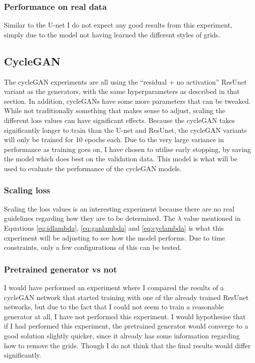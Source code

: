 \subsubsection{Performance on real data}
Similar to the U-net I do not expect any good results from this experiment, simply due to the model not having learned the different styles of grids.

\subsection{CycleGAN}
The cycleGAN experiments are all using the ``residual + no activation'' ResUnet variant as the generators, with the same hyperparameters as described in that section. In addition, cycleGANs have some more parameters that can be tweaked. While not traditionally something that makes sense to adjust, scaling the different loss values can have significant effects. Because the cycleGAN takes significantly longer to train than the U-net and ResUnet, the cycleGAN variants will only be trained for 10 epochs each. Due to the very large variance in performance as training goes on, I have chosen to utilise early stopping, by saving the model which does best on the validation data. This model is what will be used to evaluate the performance of the cycleGAN models.

\subsubsection{Scaling loss}
Scaling the loss values is an interesting experiment because there are no real guidelines regarding how they are to be determined. The $\lambda$ value mentioned in Equations \ref{eq:idlambda}, \ref{eq:ganlambda} and \ref{eq:cyclambda} is what this experiment will be adjusting to see how the model performs. Due to time constraints, only a few configurations of this can be tested.

\subsubsection{Pretrained generator vs not}
I would have performed an experiment where I compared the results of a cycleGAN network that started training with one of the already trained ResUnet networks, but due to the fact that I could not seem to train a reasonable generator at all, I have not performed this experiment. I would hypothesise that if I had performed this experiment, the pretrained generator would converge to a good solution slightly quicker, since it already has some information regarding how to remove the grids. Though I do not think that the final results would differ significantly.

